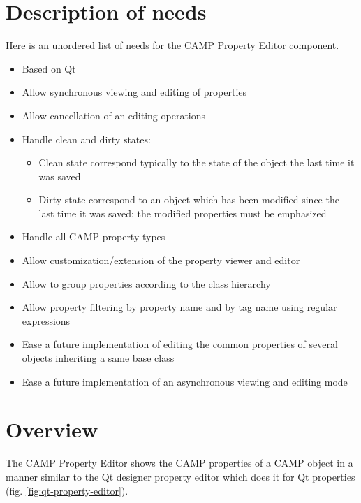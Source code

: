 \documentclass[a4paper, twoside]{report}
\begin{document}
\chapter{Description of needs\label{sec:needs}}

Here is an unordered list of needs for the CAMP Property Editor component.

\begin{itemize}
    \item Based on Qt
    \item Allow synchronous viewing and editing of properties
    \item Allow cancellation of an editing operations
    \item Handle clean and dirty states:
    \begin{itemize}
        \item Clean state correspond typically to the state of the object the last time it was saved
        \item Dirty state correspond to an object which has been modified since the last time it was
saved; the modified properties must be emphasized
    \end{itemize}
    \item Handle all CAMP property types
    \item Allow customization/extension of the property viewer and editor
    \item Allow to group properties according to the class hierarchy
    \item Allow property filtering by property name and by tag name using regular expressions
    \item Ease a future implementation of editing the common properties of several objects inheriting a same base class
    \item Ease a future implementation of an asynchronous viewing and editing mode
\end{itemize}

\chapter{Overview\label{sec:overview}}

The CAMP Property Editor shows the CAMP properties of a CAMP object in a manner similar to the Qt
designer property editor which does it for Qt properties (fig. \ref{fig:qt-property-editor}).

\end{document}
